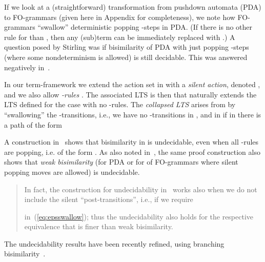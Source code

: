 \documentclass{llncs}
\begin{document}
If we look at a (straightforward) transformation from pushdown
automata (PDA) to
FO-grammars (given here in Appendix for completeness), we note how
FO-grammars ``swallow'' deterministic popping -steps in PDA.
(If there is no other rule
for  than , then any (sub)term 
 can be immediately replaced with .)
A question posed by Stirling was if bisimilarity
of PDA with just popping 
-steps (where some nondeterminism is allowed) is still
decidable. 
This was answered negatively in~\cite{DBLP:journals/jacm/JancarS08}.

In our term-framework we extend the action set in
 with a \emph{silent action}, 
denoted , and we also allow 
\emph{-rules} 
 .
 The associated LTS is then
  that naturally extends the
LTS  defined for the case with no
-rules.
The \emph{collapsed LTS} 
  arises from
  by ``swallowing'' the
 -transitions, i.e., we have no -transitions
 in , and
  in  if 
 in   
 there is a path of the form
 
A construction in~\cite{DBLP:journals/jacm/JancarS08} shows that 
bisimilarity in 
 is undecidable, even
when all -rules are popping, i.e. of the form
.
As also noted in~\cite{DBLP:journals/jacm/JancarS08}, 
the same proof construction 
also shows that 
\emph{weak bisimilarity} (for PDA or for 
of FO-grammars where silent
popping moves are allowed) is undecidable.

\begin{quote}
	{\small
In fact, the construction for undecidability 
in~\cite{DBLP:journals/jacm/JancarS08} works also when we
do not include the silent ``post-transitions'', i.e., if we require
 
in~(\ref{eq:epsswallow}); thus the undecidability 
also holds for the respective equivalence
that is finer than
weak bisimilarity.
	}		
\end{quote}	
The undecidability results have been  recently refined, using
 branching bisimilarity~\cite{DBLP:journals/corr/YinFHHT14}.
\end{document}
